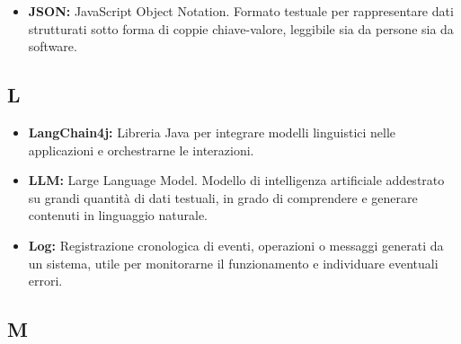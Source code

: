 \begin{itemize}
    \item \textbf{JSON:} JavaScript Object Notation. Formato testuale per rappresentare dati strutturati sotto forma di coppie chiave-valore, leggibile sia da persone sia da software.
\end{itemize}



{}
\subsection*{L}

\begin{itemize}
    \item \textbf{LangChain4j:} Libreria Java per integrare modelli linguistici nelle applicazioni e orchestrarne le interazioni.
    \item \textbf{LLM:} Large Language Model. Modello di intelligenza artificiale addestrato su grandi quantità di dati testuali, in grado di comprendere e generare contenuti in linguaggio naturale.
    \item \textbf{Log:} Registrazione cronologica di eventi, operazioni o messaggi generati da un sistema, utile per monitorarne il funzionamento e individuare eventuali errori.
\end{itemize}


{}
\subsection*{M}


